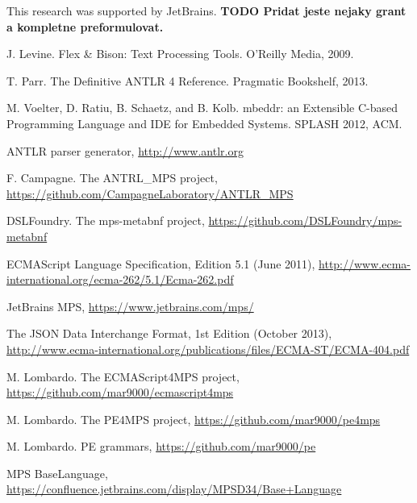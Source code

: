\documentclass[preprint,10pt]{sigplanconf}
\newcommand{\todo}[1]{{\bfseries TODO #1}}
\begin{document}











\acks
This research was supported by JetBrains. \todo{Pridat jeste nejaky grant a kompletne preformulovat.}



\begin{thebibliography}{}

 J. Levine. Flex \& Bison: Text Processing Tools. O'Reilly Media, 2009.

 T. Parr. The Definitive ANTLR 4 Reference. Pragmatic Bookshelf, 2013.

 M. Voelter, D. Ratiu, B. Schaetz, and B. Kolb. mbeddr: an Extensible C-based Programming Language and IDE for Embedded Systems. SPLASH 2012, ACM.

 ANTLR parser generator, \url{http://www.antlr.org}

 F. Campagne. The ANTRL{\_}MPS project, \url{https://github.com/CampagneLaboratory/ANTLR_MPS}

 DSLFoundry. The mps-metabnf project, \url{https://github.com/DSLFoundry/mps-metabnf}

 ECMAScript Language Specification, Edition 5.1 (June 2011), \url{http://www.ecma-international.org/ecma-262/5.1/Ecma-262.pdf}

 JetBrains MPS, \url{https://www.jetbrains.com/mps/}

 The JSON Data Interchange Format, 1st Edition (October 2013), \url{http://www.ecma-international.org/publications/files/ECMA-ST/ECMA-404.pdf}

 M. Lombardo. The ECMAScript4MPS project, \url{https://github.com/mar9000/ecmascript4mps}

 M. Lombardo. The PE4MPS project, \url{https://github.com/mar9000/pe4mps}

 M. Lombardo. PE grammars, \url{https://github.com/mar9000/pe}

 MPS BaseLanguage, \url{https://confluence.jetbrains.com/display/MPSD34/Base+Language}

\end{thebibliography}
\end{document}
